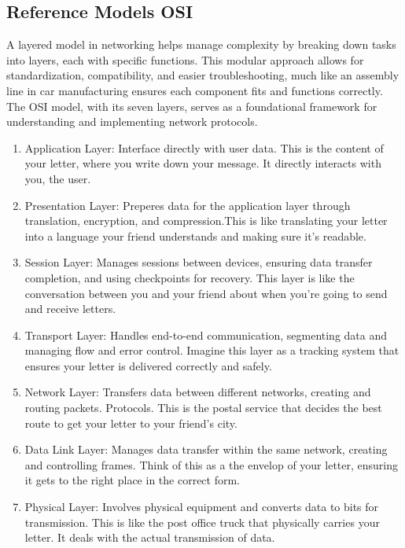 \documentclass[a4paper,11pt]{article}
\begin{document}
\subsection{Reference Models OSI}
A layered model in networking helps manage complexity by breaking down tasks into layers, each with specific functions. This modular approach allows for standardization, compatibility, and easier troubleshooting, much like an assembly line in car manufacturing ensures each component fits and functions correctly. The OSI model, with its seven layers, serves as a foundational framework for understanding and implementing network protocols.\\

\begin{enumerate}
    \item Application Layer: Interface directly with user data. This is the content of your letter, where you write down your message. It directly interacts with you, the user.\\
    \item Presentation Layer: Preperes data for the application layer through translation, encryption, and compression.This is like translating your letter into a language your friend understands and making sure it's readable.\\
    \item Session Layer: Manages sessions between devices, ensuring data transfer completion, and using checkpoints for recovery. This layer is like the conversation between you and your friend about when you're going to send and receive letters.\\
    \item Transport Layer: Handles end-to-end communication, segmenting data and managing flow and error control. Imagine this layer  as a tracking system that ensures your letter is delivered correctly and safely.\\
    \item Network Layer: Transfers data between different networks, creating and routing packets. Protocols. This is the postal service that decides the best route to get your letter to your friend's city.\\
    \item Data Link Layer: Manages data transfer within the same network, creating and controlling frames. Think of this as a the envelop of your letter, ensuring it gets to the right place in the correct form.\\
    \item Physical Layer: Involves physical equipment and converts data to bits for transmission.  This is like the post office truck that physically carries your letter. It deals with the actual transmission of data.\\
\end{enumerate}
\end{document}
